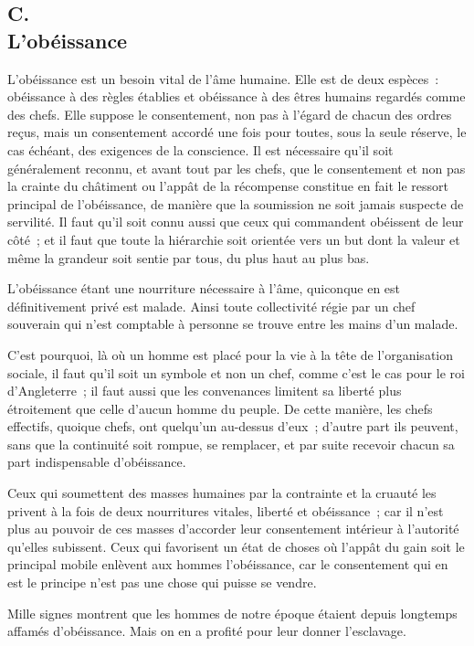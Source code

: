 \documentclass[french,twoside]{book} %
\begin{document}
\subsection[C. L’obéissance]{C. \\
L’obéissance}
\noindent \par
L'obéissance est un besoin vital de l'âme humaine. Elle est de deux espèces : obéissance à des règles établies et obéissance à des êtres humains regardés comme des chefs. Elle suppose le consentement, non pas à l'égard de chacun des ordres reçus, mais un consentement accordé une fois pour toutes, sous la seule réserve, le cas échéant, des exigences de la conscience. Il est nécessaire qu'il soit généralement reconnu, et avant tout par les chefs, que le consentement et non pas la crainte du châtiment ou l'appât de la récompense constitue en fait le ressort principal de l'obéissance, de manière que la soumission ne soit jamais suspecte de servilité. Il faut qu'il soit connu aussi que ceux qui commandent obéissent de leur côté ; et il faut que toute la hiérarchie soit orientée vers un but dont la valeur et même la grandeur soit sentie par tous, du plus haut au plus bas.\par
L'obéissance étant une nourriture nécessaire à l'âme, quiconque en est définitivement privé est malade. Ainsi toute collectivité régie par un chef souverain qui n'est comptable à personne se trouve entre les mains d'un malade.\par
C'est pourquoi, là où un homme est placé pour la vie à la tête de l'organisation sociale, il faut qu'il soit un symbole et non un chef, comme c'est le cas pour le roi d'Angleterre ; il faut aussi que les convenances limitent sa liberté plus étroitement que celle d'aucun homme du peuple. De cette manière, les chefs effectifs, quoique chefs, ont quelqu'un au-dessus d'eux ; d'autre part ils peuvent, sans que la continuité soit rompue, se remplacer, et par suite recevoir chacun sa part indispensable d'obéissance.\par
Ceux qui soumettent des masses humaines par la contrainte et la cruauté les privent à la fois de deux nourritures vitales, liberté et obéissance ; car il n'est plus au pouvoir de ces masses d'accorder leur consentement intérieur à l'autorité qu'elles subissent. Ceux qui favorisent un état de choses où l'appât du gain soit le principal mobile enlèvent aux hommes l'obéissance, car le consentement qui en est le principe n'est pas une chose qui puisse se vendre.\par
Mille signes montrent que les hommes de notre époque étaient depuis longtemps affamés d'obéissance. Mais on en a profité pour leur donner l'esclavage.
\end{document}
